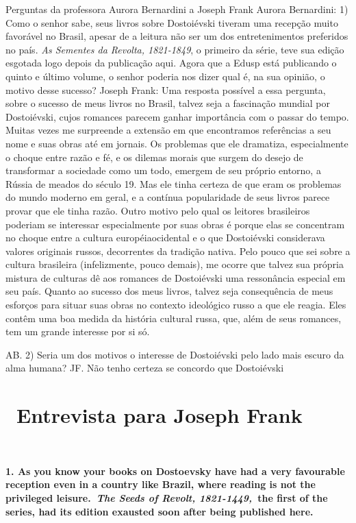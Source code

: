 Perguntas da professora Aurora Bernardini a Joseph Frank Aurora
Bernardini: 1) Como o senhor sabe, seus livros sobre Dostoiévski tiveram
uma recepção muito favorável no Brasil, apesar de a leitura não ser um
dos entretenimentos preferidos no país. \emph{As Sementes da Revolta,
1821-1849}, o primeiro da série, teve sua edição esgotada logo depois da
publicação aqui. Agora que a Edusp está publicando o quinto e último
volume, o senhor poderia nos dizer qual é, na sua opinião, o motivo
desse sucesso? Joseph Frank: Uma resposta possível a essa pergunta,
sobre o sucesso de meus livros no Brasil, talvez seja a fascinação
mundial por Dostoiévski, cujos romances parecem ganhar importância com o
passar do tempo. Muitas vezes me surpreende a extensão em que
encontramos referências a seu nome e suas obras até em jornais. Os
problemas que ele dramatiza, especialmente o choque entre razão e fé, e
os dilemas morais que surgem do desejo de transformar a sociedade como
um todo, emergem de seu próprio entorno, a Rússia de meados do século
19. Mas ele tinha certeza de que eram os problemas do mundo moderno em
geral, e a contínua popularidade de seus livros parece provar que ele
tinha razão. Outro motivo pelo qual os leitores brasileiros poderiam se
interessar especialmente por suas obras é porque elas se concentram no
choque entre a cultura européiaocidental e o que Dostoiévski considerava
valores originais russos, decorrentes da tradição nativa. Pelo pouco que
sei sobre a cultura brasileira (infelizmente, pouco demais), me ocorre
que talvez sua própria mistura de culturas dê aos romances de
Dostoiévski uma ressonância especial em seu país. Quanto ao sucesso dos
meus livros, talvez seja consequência de meus esforços para situar suas
obras no contexto ideológico russo a que ele reagia. Eles contêm uma boa
medida da história cultural russa, que, além de seus romances, tem um
grande interesse por si só.

AB. 2) Seria um dos motivos o interesse de Dostoiévski pelo lado mais
escuro da alma humana? JF. Não tenho certeza se concordo que Dostoiévski

\section{~Entrevista para Joseph Frank~}

\textbf{~}

\textbf{1. As you know your books on Dostoevsky have had a very
favourable reception even in a country like Brazil, where reading is not
the privileged leisure.~\emph{The Seeds of Revolt, 1821-1449,~}the first
of the series, had its edition exausted soon after being published
here.}

